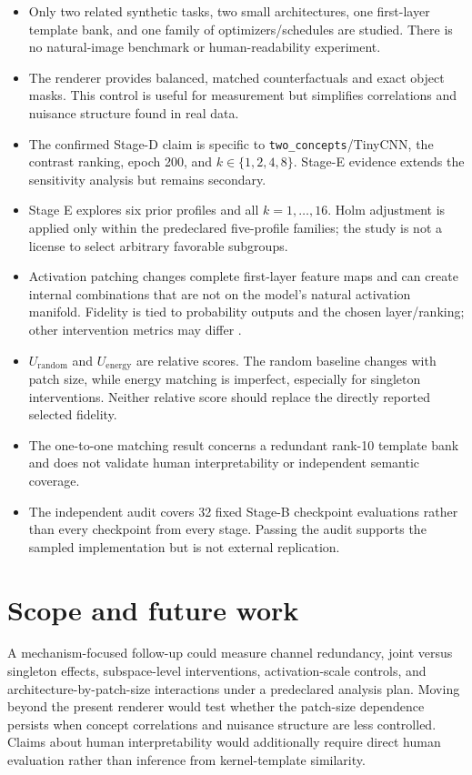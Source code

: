 \documentclass[10pt]{article}
\begin{document}
\begin{itemize}
\item Only two related synthetic tasks, two small architectures, one first-layer template bank, and one family of optimizers/schedules are studied. There is no natural-image benchmark or human-readability experiment.
\item The renderer provides balanced, matched counterfactuals and exact object masks. This control is useful for measurement but simplifies correlations and nuisance structure found in real data.
\item The confirmed Stage-D claim is specific to \texttt{two\_concepts}/TinyCNN, the contrast ranking, epoch 200, and $k\in\{1,2,4,8\}$. Stage-E evidence extends the sensitivity analysis but remains secondary.
\item Stage E explores six prior profiles and all $k=1,\ldots,16$. Holm adjustment is applied only within the predeclared five-profile families; the study is not a license to select arbitrary favorable subgroups.
\item Activation patching changes complete first-layer feature maps and can create internal combinations that are not on the model's natural activation manifold. Fidelity is tied to probability outputs and the chosen layer/ranking; other intervention metrics may differ \citep{zhang_2024_activation-patching,heimersheim_2024_activation-patching}.
\item $U_{\mathrm{random}}$ and $U_{\mathrm{energy}}$ are relative scores. The random baseline changes with patch size, while energy matching is imperfect, especially for singleton interventions. Neither relative score should replace the directly reported selected fidelity.
\item The one-to-one matching result concerns a redundant rank-10 template bank and does not validate human interpretability or independent semantic coverage.
\item The independent audit covers 32 fixed Stage-B checkpoint evaluations rather than every checkpoint from every stage. Passing the audit supports the sampled implementation but is not external replication.
\end{itemize}

\section{Scope and future work}\label{sec:future}

A mechanism-focused follow-up could measure channel redundancy, joint versus singleton effects, subspace-level interventions, activation-scale controls, and architecture-by-patch-size interactions under a predeclared analysis plan. Moving beyond the present renderer would test whether the patch-size dependence persists when concept correlations and nuisance structure are less controlled. Claims about human interpretability would additionally require direct human evaluation rather than inference from kernel-template similarity.
\end{document}
